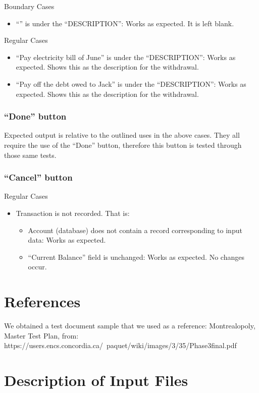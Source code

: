 \documentclass[12pt]{article}
\begin{document}
Boundary Cases
\begin{itemize}
  \item ``'' is under the ``DESCRIPTION'': Works as expected. It is left blank.
\end{itemize}

Regular Cases
\begin{itemize}
  \item  ``Pay electricity bill of June'' is under the ``DESCRIPTION'': Works as expected. Shows this as the description for the withdrawal.
  \item  ``Pay off the debt owed to Jack'' is under the ``DESCRIPTION'': Works as expected. Shows this as the description for the withdrawal.
\end{itemize}

\subsubsection{``Done'' button}

Expected output is relative to the outlined uses in the above cases. They all require the use of the ``Done'' button, therefore this button is tested through those same tests.
	
\subsubsection{``Cancel'' button}

Regular Cases
\begin{itemize}
  \item Transaction is not recorded. That is:
  \begin{itemize}
    \item Account (database) does not contain a record corresponding to input data: Works as expected.
    \item ``Current Balance'' field is unchanged: Works as expected. No changes occur.
  \end{itemize}
\end{itemize}

\section{References}
We obtained a test document sample that we used as a reference: Montrealopoly, Master Test Plan, from: https://users.encs.concordia.ca/~paquet/wiki/images/3/35/Phase3final.pdf

\appendix

\section{Description of Input Files}
\end{document}
